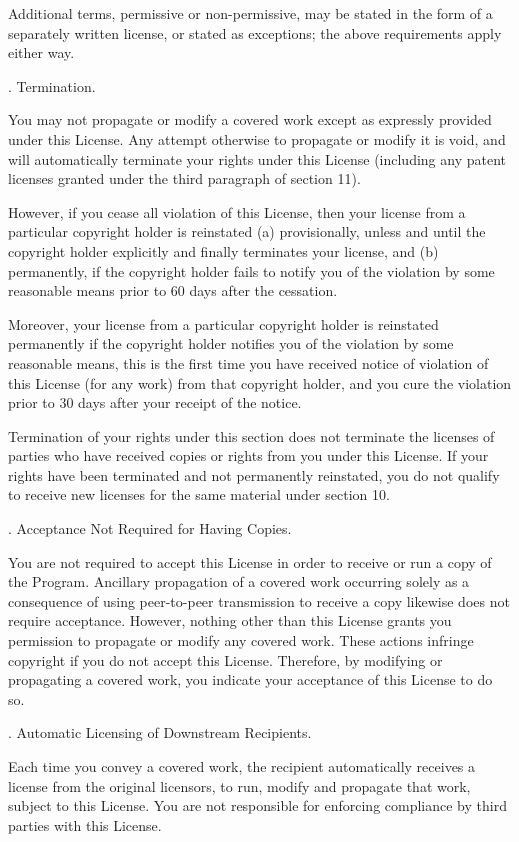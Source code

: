 Additional terms, permissive or non-permissive, may be stated in the
form of a separately written license, or stated as exceptions;
the above requirements apply either way.

. Termination.

You may not propagate or modify a covered work except as expressly
provided under this License.  Any attempt otherwise to propagate or
modify it is void, and will automatically terminate your rights under
this License (including any patent licenses granted under the third
paragraph of section 11).

However, if you cease all violation of this License, then your
license from a particular copyright holder is reinstated (a)
provisionally, unless and until the copyright holder explicitly and
finally terminates your license, and (b) permanently, if the copyright
holder fails to notify you of the violation by some reasonable means
prior to 60 days after the cessation.

Moreover, your license from a particular copyright holder is
reinstated permanently if the copyright holder notifies you of the
violation by some reasonable means, this is the first time you have
received notice of violation of this License (for any work) from that
copyright holder, and you cure the violation prior to 30 days after
your receipt of the notice.

Termination of your rights under this section does not terminate the
licenses of parties who have received copies or rights from you under
this License.  If your rights have been terminated and not permanently
reinstated, you do not qualify to receive new licenses for the same
material under section 10.

. Acceptance Not Required for Having Copies.

You are not required to accept this License in order to receive or
run a copy of the Program.  Ancillary propagation of a covered work
occurring solely as a consequence of using peer-to-peer transmission
to receive a copy likewise does not require acceptance.  However,
nothing other than this License grants you permission to propagate or
modify any covered work.  These actions infringe copyright if you do
not accept this License.  Therefore, by modifying or propagating a
covered work, you indicate your acceptance of this License to do so.

. Automatic Licensing of Downstream Recipients.

Each time you convey a covered work, the recipient automatically
receives a license from the original licensors, to run, modify and
propagate that work, subject to this License.  You are not responsible
for enforcing compliance by third parties with this License.

